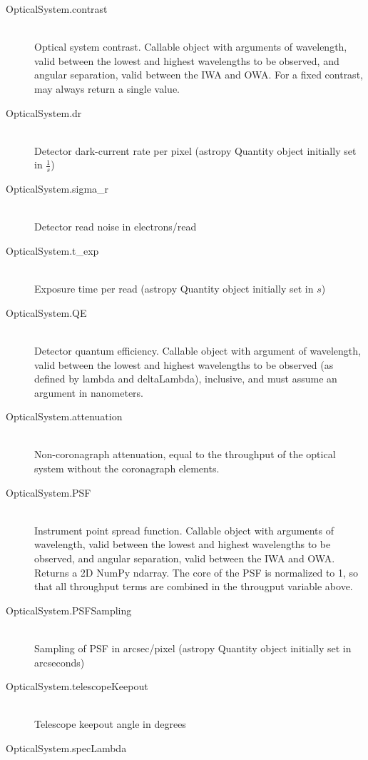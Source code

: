 \documentclass[cleanfoot]{asme2ej}
\begin{document}
\begin{itemize}
\begin{description}
        \item[OpticalSystem.contrast] \hfill \\
        Optical system contrast.  Callable object with arguments of wavelength, valid between the lowest and highest wavelengths to be observed, and angular separation, valid between the IWA and OWA.  For a fixed contrast, may always return a single value. 
        \item[OpticalSystem.dr] \hfill \\
        Detector dark-current rate per pixel (astropy Quantity object initially set in $ \frac{1}{s} $)
        \item[OpticalSystem.sigma\_r] \hfill \\
        Detector read noise in electrons/read
        \item[OpticalSystem.t\_exp] \hfill \\
        Exposure time per read (astropy Quantity object initially set in $ s $)
        \item[OpticalSystem.QE] \hfill \\
        Detector quantum efficiency.  Callable object with argument of wavelength, valid between the lowest and highest wavelengths to be observed (as defined by lambda and deltaLambda), inclusive, and must assume an argument in nanometers.
        \item[OpticalSystem.attenuation] \hfill \\
        Non-coronagraph attenuation, equal to the throughput of the optical system without the coronagraph elements.
        \item[OpticalSystem.PSF] \hfill \\
        Instrument point spread function.  Callable object with arguments of wavelength, valid between the lowest and highest wavelengths to be observed, and angular separation, valid between the IWA and OWA.  Returns a 2D NumPy ndarray.  The core of the PSF is normalized to 1, so that all throughput terms are combined in the througput variable above. 
        \item[OpticalSystem.PSFSampling] \hfill \\
        Sampling of PSF in arcsec/pixel (astropy Quantity object initially set in arcseconds)
        \item[OpticalSystem.telescopeKeepout] \hfill \\
        Telescope keepout angle in degrees
        \item[OpticalSystem.specLambda] \hfill \\

\end{description}
\end{itemize}
\end{document}
